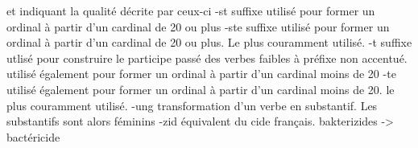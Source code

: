 {             et indiquant la qualité décrite par ceux-ci
-st          suffixe utilisé pour former un ordinal à partir d'un cardinal de 20 ou plus
-ste         suffixe utilisé pour former un ordinal à partir d'un cardinal de 20 ou plus.
             Le plus couramment utilisé.
-t           suffixe utlisé pour construire le participe passé des verbes faibles
             à préfixe non accentué.
             utilisé également pour former un ordinal à partir d'un cardinal moins de 20
-te          utilisé également pour former un ordinal à partir d'un cardinal moins de 20.
             le plus couramment utilisé.
-ung         transformation d'un verbe en substantif. Les substantifs sont alors féminins
-zid         équivalent du cide français. bakterizides -> bactéricide
}
